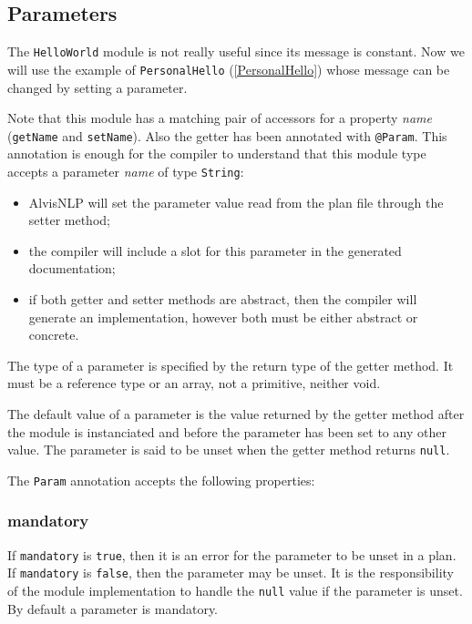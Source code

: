 \documentclass[a4paper]{article}
\begin{document}
\subsection{Parameters}
The \texttt{HelloWorld} module is not really useful since its message is constant.
Now we will use the example of \texttt{PersonalHello} (\ref{PersonalHello}) whose message can be changed by setting a parameter.


Note that this module has a matching pair of accessors for a property \emph{name} (\texttt{getName} and \texttt{setName}).
Also the getter has been annotated with \texttt{@Param}.
This annotation is enough for the compiler to understand that this module type accepts a parameter \emph{name} of type \texttt{String}:
\begin{itemize}
\item AlvisNLP will set the parameter value read from the plan file through the setter method;
\item the compiler will include a slot for this parameter in the generated documentation;
\item if both getter and setter methods are abstract, then the compiler will generate an implementation, however both must be either abstract or concrete.
\end{itemize}

The type of a parameter is specified by the return type of the getter method.
It must be a reference type or an array, not a primitive, neither void.

The default value of a parameter is the value returned by the getter method after the module is instanciated and before the parameter has been set to any other value.
The parameter is said to be unset when the getter method returns \texttt{null}.

The \texttt{Param} annotation accepts the following properties:

\subsubsection{mandatory}
If \texttt{mandatory} is \texttt{true}, then it is an error for the parameter to be unset in a plan.
If \texttt{mandatory} is \texttt{false}, then the parameter may be unset.
It is the responsibility of the module implementation to handle the \texttt{null} value if the parameter is unset.
By default a parameter is mandatory.
\end{document}
